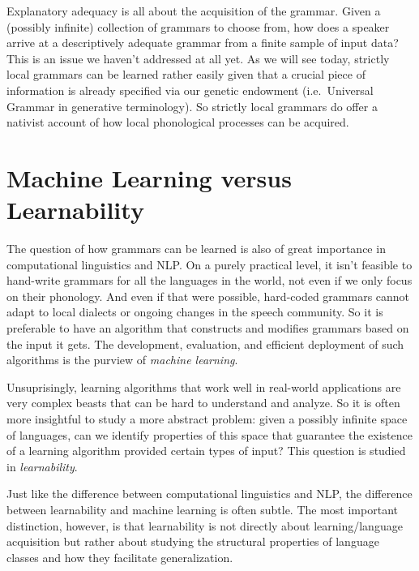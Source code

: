 Explanatory adequacy is all about the acquisition of the grammar.
Given a (possibly infinite) collection of grammars to choose from, how does a speaker arrive at a descriptively adequate grammar from a finite sample of input data?
This is an issue we haven't addressed at all yet. 
As we will see today, strictly local grammars can be learned rather easily given that a crucial piece of information is already specified via our genetic endowment (i.e.\ Universal Grammar in generative terminology).
So strictly local grammars do offer a nativist account of how local phonological processes can be acquired.

\section{Machine Learning versus Learnability}

The question of how grammars can be learned is also of great importance in computational linguistics and NLP\@.
On a purely practical level, it isn't feasible to hand-write grammars for all the languages in the world, not even if we only focus on their phonology.
And even if that were possible, hard-coded grammars cannot adapt to local dialects or ongoing changes in the speech community.
So it is preferable to have an algorithm that constructs and modifies grammars based on the input it gets.
The development, evaluation, and efficient deployment of such algorithms is the purview of \emph{machine learning}.

Unsuprisingly, learning algorithms that work well in real-world applications are very complex beasts that can be hard to understand and analyze.
So it is often more insightful to study a more abstract problem: given a possibly infinite space of languages, can we identify properties of this space that guarantee the existence of a learning algorithm provided certain types of input?
This question is studied in \emph{learnability}.

Just like the difference between computational linguistics and NLP, the difference between learnability and machine learning is often subtle.
The most important distinction, however, is that learnability is not directly about learning\slash language acquisition but rather about studying the structural properties of language classes and how they facilitate generalization.

